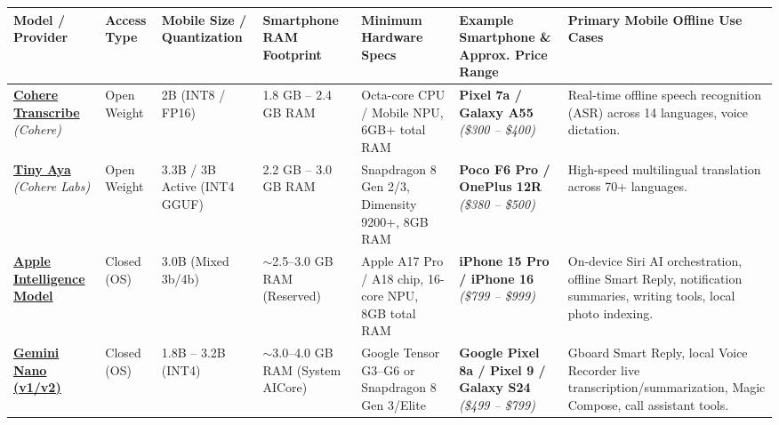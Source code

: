 \documentclass[10pt,landscape,a4paper]{article}
\begin{document}
\begin{longtable}{p{2.6cm} p{1.6cm} p{1.8cm} p{2.2cm} p{2.6cm} p{4.2cm} p{6.8cm}}
    \hline
    \rowcolor{headerblue}
    \color{white}\textbf{Model / Provider} & 
    \color{white}\textbf{Access Type} & 
    \color{white}\textbf{Mobile Size / Quantization} & 
    \color{white}\textbf{Smartphone RAM Footprint} & 
    \color{white}\textbf{Minimum Hardware Specs} & 
    \color{white}\textbf{Example Smartphone \& Approx. Price Range} & 
    \color{white}\textbf{Primary Mobile Offline Use Cases} \\
    \hline
    \endhead

    \textbf{\href{https://cohere.com/transcribe}{Cohere Transcribe}} \newline \textit{(Cohere)} & Open Weight & 2B \newline (INT8 / FP16) & 1.8 GB -- 2.4 GB RAM & Octa-core CPU / Mobile NPU, 6GB+ total RAM & \textbf{Pixel 7a / Galaxy A55} \newline \textit{(\$300 -- \$400)} & Real-time offline speech recognition (ASR) across 14 languages, voice dictation. \\

    \textbf{\href{https://docs.cohere.com/docs/tiny-aya}{Tiny Aya}} \newline \textit{(Cohere Labs)} & Open Weight & 3.3B / 3B Active \newline (INT4 GGUF) & 2.2 GB -- 3.0 GB RAM & Snapdragon 8 Gen 2/3, Dimensity 9200+, 8GB RAM & \textbf{Poco F6 Pro / OnePlus 12R} \newline \textit{(\$380 -- \$500)} & High-speed multilingual translation across 70+ languages. \\

    \textbf{\href{https://developer.apple.com/apple-intelligence/}{Apple Intelligence Model}} & Closed (OS) & 3.0B \newline (Mixed 3b/4b) & $\sim$2.5--3.0 GB RAM \newline (Reserved) & Apple A17 Pro / A18 chip, 16-core NPU, 8GB total RAM & \textbf{iPhone 15 Pro / iPhone 16} \newline \textit{(\$799 -- \$999)} & On-device Siri AI orchestration, offline Smart Reply, notification summaries, writing tools, local photo indexing. \\

    \textbf{\href{https://store.google.com/us/magazine/gemini-nano-offline?hl=en-US}{Gemini Nano (v1/v2)}} & Closed (OS) & 1.8B -- 3.2B \newline (INT4) & $\sim$3.0--4.0 GB RAM \newline (System AICore) & Google Tensor G3--G6 or Snapdragon 8 Gen 3/Elite & \textbf{Google Pixel 8a / Pixel 9 / Galaxy S24} \newline \textit{(\$499 -- \$799)} & Gboard Smart Reply, local Voice Recorder live transcription/summarization, Magic Compose, call assistant tools. \\


\end{longtable}
\end{document}
